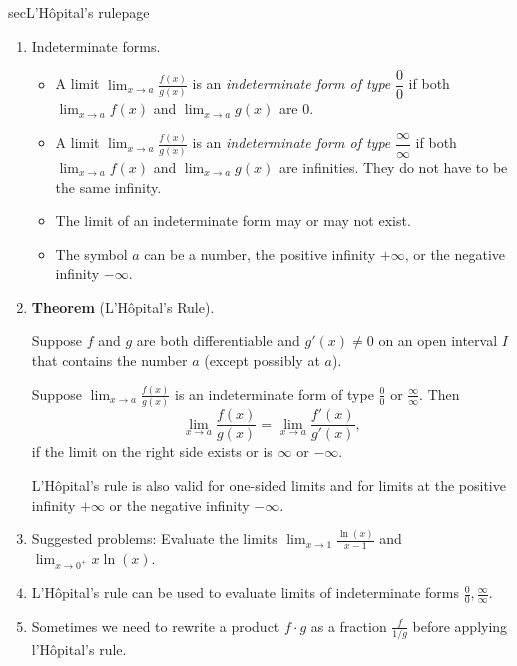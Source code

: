 \documentclass[../main]{subfiles}
\begin{document}
\begin{outline}{sec}{L'H\^opital's rule}{page} \label{outline:lhopital}
  \begin{enumerate}
    \item Indeterminate forms. %
      \begin{itemize}
        \item A limit \(\lim_{x \to a} \frac{f(x)}{g(x)}\) is an \emph{indeterminate form of type} \(\dfrac{0}{0}\) if both \(\lim_{x \to a} f(x)\) and \(\lim_{x \to a} g(x)\) are \(0\).  
        \item A limit \(\lim_{x \to a} \frac{f(x)}{g(x)}\) is an \emph{indeterminate form of type} \(\dfrac{\infty}{\infty}\) if both \(\lim_{x \to a} f(x)\) and \(\lim_{x \to a} g(x)\) are infinities. They do not have to be the same infinity.
        \item The limit of an indeterminate form may or may not exist.
        \item The symbol \(a\) can be a number, the positive infinity \(+ \infty\), or the negative infinity \(-\infty\).
      \end{itemize}
      
    \item \textbf{Theorem} (L'H\^{o}pital's Rule).
      \begin{mdframed}[style=simple]
        Suppose \(f\) and \(g\) are both differentiable and \(g'(x) \ne 0\) on an open interval \(I\) that contains the number \(a\) (except possibly at \(a\)). 

        Suppose \(\lim_{x \to a}\frac{f(x)}{g(x)}\) is an indeterminate form of type \(\frac{0}{0}\) or \(\frac{\infty}{\infty}\).  Then 
        \[ \lim_{x \to a} \frac{f(x)}{g(x)} = \lim_{x \to a} \frac{f'(x)}{g'(x)}, \]
        if the limit on the right side exists or is \(\infty\) or \(-\infty\).

        \medskip
        L'H\^{o}pital's rule is also valid for one-sided limits and for limits at the positive infinity \(+\infty\) or the negative infinity \(-\infty\).
      \end{mdframed}
        

    \item Suggested problems: Evaluate the limits \(\lim_{x \to 1} \frac{\ln(x)}{x - 1}\) and \(\lim_{x \to 0^{+}} x \ln(x)\).
      
    \item {L'H\^{o}pital's rule can be used to evaluate limits of indeterminate forms \(\frac{0}{0}, \frac{\infty}{\infty}\).}
    \item {Sometimes we need to rewrite a product \(f \cdot g\) as a fraction \(\frac{f}{1/g}\) before applying l'H\^{o}pital's rule.}
\end{enumerate}
\end{outline}
\end{document}
